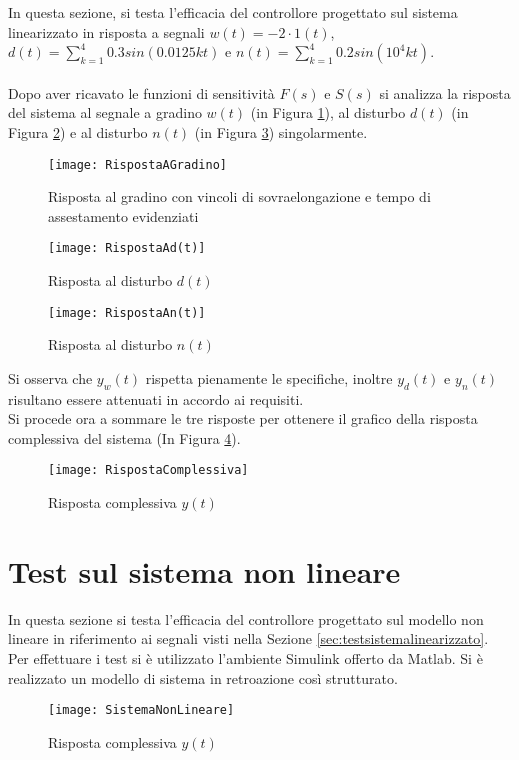 \documentclass[a4paper, 11pt]{article}
\begin{document}
In questa sezione, si testa l'efficacia del controllore progettato sul sistema linearizzato in risposta a segnali $w(t)=-2\cdot1(t)$, $d(t)=\sum_{k=1}^{4}0.3sin(0.0125kt)$ e $n(t)=\sum_{k=1}^{4}0.2sin(10^4kt)$.
\\
\\
Dopo aver ricavato le funzioni di sensitività $F(s)$ e $S(s)$ si analizza la risposta del sistema al segnale a gradino $w(t)$ (in Figura \ref{Figura 6}), al disturbo $d(t)$ (in Figura \ref{Figura 7}) e al disturbo $n(t)$ (in Figura \ref{Figura 8}) singolarmente.  
\\
\begin{figure}[H]
	\centering
	\texttt{[image: RispostaAGradino]}
	\caption[]{Risposta al gradino con vincoli di sovraelongazione e tempo di assestamento evidenziati}
	\label{Figura 6}
\end{figure}
\begin{figure}[H]
	\centering
	\texttt{[image: RispostaAd(t)]}
	\caption[]{Risposta al disturbo $d(t)$}
	\label{Figura 7}
\end{figure}
\begin{figure}[H]
	\centering
	\texttt{[image: RispostaAn(t)]}
	\caption[]{Risposta al disturbo $n(t)$}
	\label{Figura 8}
\end{figure}

Si osserva che $y_w(t)$ rispetta pienamente le specifiche, inoltre $y_d(t)$ e $y_n(t)$ risultano essere attenuati in accordo ai requisiti.
\\
Si procede ora a sommare le tre risposte per ottenere il grafico della risposta complessiva del sistema (In Figura \ref{Figura 9}).\\
\begin{figure}[H]
	\centering
	\texttt{[image: RispostaComplessiva]}
	\caption[]{Risposta complessiva $y(t)$}
	\label{Figura 9}
\end{figure}
\section{Test sul sistema non lineare}

In questa sezione si testa l'efficacia del controllore progettato sul modello non lineare in riferimento ai segnali visti nella Sezione \ref{sec:testsistemalinearizzato}.
\\
Per effettuare i test si è utilizzato l'ambiente Simulink offerto da Matlab.
Si è realizzato un modello di sistema in retroazione così strutturato.
\begin{figure}[H]
	\centering
	\texttt{[image: SistemaNonLineare]}
	\caption[]{Risposta complessiva $y(t)$}
	\label{Figura 10}
\end{figure}
\end{document}

